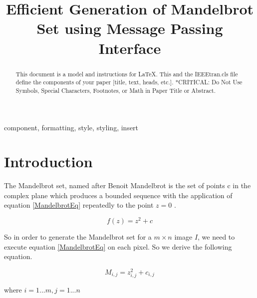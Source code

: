 \documentclass[conference]{IEEEtran}
\begin{document}
	
	\title{Efficient Generation of Mandelbrot Set using Message Passing Interface}
	
	\author{
	}
	\maketitle
	
	\begin{abstract}
		This document is a model and instructions for \LaTeX.
		This and the IEEEtran.cls file define the components of your paper [title, text, heads, etc.]. *CRITICAL: Do Not Use Symbols, Special Characters, Footnotes, 
		or Math in Paper Title or Abstract.
	\end{abstract}
	
	\begin{IEEEkeywords}
		component, formatting, style, styling, insert
	\end{IEEEkeywords}
	
	\section{Introduction}

	The Mandelbrot set, named after Benoit Mandelbrot is the set of points c in the complex plane which produces a bounded sequence with the application of equation \ref{MandelbrotEq} repeatedly to the point $z=0$ \cite{Mandelbrotset}. 	

	\begin{equation}
		f(z)=z^{2} + c \label{MandelbrotEq}
	\end{equation}
	
	So in order to generate the Mandelbrot set for a $m \times n$ image $I$, we need to execute equation \ref{MandelbrotEq} on each pixel. So we derive the following equation.
	
	\begin{equation}
				M_{i,j} = z_{i,j}^2 + c_{i,j}  \label{MandelPixel}
	\end{equation}

	\begin{center}
	where $i = 1...m, j = 1...n$
	\end{center}
 	
\end{document}
